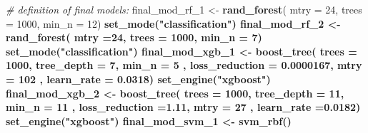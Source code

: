 \documentclass[
]{article}
\newenvironment{Shaded}{\begin{snugshade}}{\end{snugshade}}
\newcommand{\CommentTok}[1]{\textcolor[rgb]{0.56,0.35,0.01}{\textit{#1}}}
\newcommand{\DataTypeTok}[1]{\textcolor[rgb]{0.13,0.29,0.53}{#1}}
\newcommand{\DecValTok}[1]{\textcolor[rgb]{0.00,0.00,0.81}{#1}}
\newcommand{\FloatTok}[1]{\textcolor[rgb]{0.00,0.00,0.81}{#1}}
\newcommand{\KeywordTok}[1]{\textcolor[rgb]{0.13,0.29,0.53}{\textbf{#1}}}
\newcommand{\NormalTok}[1]{#1}
\newcommand{\OperatorTok}[1]{\textcolor[rgb]{0.81,0.36,0.00}{\textbf{#1}}}
\newcommand{\StringTok}[1]{\textcolor[rgb]{0.31,0.60,0.02}{#1}}
\begin{document}
\begin{Shaded}
\begin{Highlighting}[]
\CommentTok{# definition of final models:}
\NormalTok{final_mod_rf_}\DecValTok{1}\NormalTok{ <-}\StringTok{ }\KeywordTok{rand_forest}\NormalTok{( }\DataTypeTok{mtry =} \DecValTok{24}\NormalTok{, }\DataTypeTok{trees =} \DecValTok{1000}\NormalTok{, }\DataTypeTok{min_n =} \DecValTok{12}\NormalTok{) }\OperatorTok{%>%}
\StringTok{  }\KeywordTok{set_mode}\NormalTok{(}\StringTok{"classification"}\NormalTok{) }\OperatorTok{%>%}\StringTok{ }\KeywordTok{set_engine}\NormalTok{(}\StringTok{"ranger"}\NormalTok{)}
\NormalTok{final_mod_rf_}\DecValTok{2}\NormalTok{ <-}\StringTok{ }\KeywordTok{rand_forest}\NormalTok{( }\DataTypeTok{mtry =}\DecValTok{24}\NormalTok{, }\DataTypeTok{trees =} \DecValTok{1000}\NormalTok{, }\DataTypeTok{min_n =} \DecValTok{7}\NormalTok{) }\OperatorTok{%>%}\StringTok{ }
\StringTok{  }\KeywordTok{set_mode}\NormalTok{(}\StringTok{"classification"}\NormalTok{) }\OperatorTok{%>%}\StringTok{ }\KeywordTok{set_engine}\NormalTok{(}\StringTok{"ranger"}\NormalTok{)}
\NormalTok{final_mod_xgb_}\DecValTok{1}\NormalTok{ <-}\StringTok{ }\KeywordTok{boost_tree}\NormalTok{(}
  \DataTypeTok{trees =} \DecValTok{1000}\NormalTok{, }\DataTypeTok{tree_depth =} \DecValTok{7}\NormalTok{, }\DataTypeTok{min_n =} \DecValTok{5}\NormalTok{ , }\DataTypeTok{loss_reduction =} \FloatTok{0.0000167}\NormalTok{, }\DataTypeTok{mtry =} \DecValTok{102}\NormalTok{ , }\DataTypeTok{learn_rate =} \FloatTok{0.0318}\NormalTok{) }\OperatorTok{%>%}
\StringTok{  }\KeywordTok{set_engine}\NormalTok{(}\StringTok{"xgboost"}\NormalTok{) }\OperatorTok{%>%}\StringTok{ }\KeywordTok{set_mode}\NormalTok{(}\StringTok{"classification"}\NormalTok{)}
\NormalTok{final_mod_xgb_}\DecValTok{2}\NormalTok{ <-}\StringTok{ }\KeywordTok{boost_tree}\NormalTok{(}
  \DataTypeTok{trees =} \DecValTok{1000}\NormalTok{, }\DataTypeTok{tree_depth =} \DecValTok{11}\NormalTok{, }\DataTypeTok{min_n =} \DecValTok{11}\NormalTok{ , }\DataTypeTok{loss_reduction =}\FloatTok{1.11}\NormalTok{, }\DataTypeTok{mtry =} \DecValTok{27}\NormalTok{ , }\DataTypeTok{learn_rate =}\FloatTok{0.0182}\NormalTok{)}\OperatorTok{%>%}
\StringTok{  }\KeywordTok{set_engine}\NormalTok{(}\StringTok{"xgboost"}\NormalTok{) }\OperatorTok{%>%}\StringTok{ }\KeywordTok{set_mode}\NormalTok{(}\StringTok{"classification"}\NormalTok{)}
\NormalTok{final_mod_svm_}\DecValTok{1}\NormalTok{ <-}\StringTok{ }\KeywordTok{svm_rbf}\NormalTok{() }\OperatorTok{%>%}\StringTok{ }\KeywordTok{set_engine}\NormalTok{(}\StringTok{"kernlab"}\NormalTok{) }\OperatorTok{%>%}\StringTok{ }\KeywordTok{set_mode}\NormalTok{(}\StringTok{"classification"}\NormalTok{) }\CommentTok{#default}
}}}}}}}}}
\end{Highlighting}
\end{Shaded}
\end{document}
